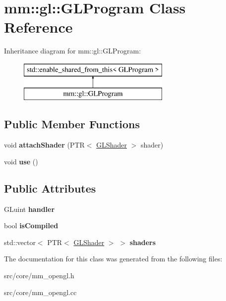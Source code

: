 \hypertarget{classmm_1_1gl_1_1_g_l_program}{}\section{mm\+:\+:gl\+:\+:G\+L\+Program Class Reference}
\label{classmm_1_1gl_1_1_g_l_program}
Inheritance diagram for mm\+:\+:gl\+:\+:G\+L\+Program\+:\begin{figure}[H]
\begin{center}
\leavevmode
\includegraphics[height=2.000000cm]{classmm_1_1gl_1_1_g_l_program}
\end{center}
\end{figure}
\subsection*{Public Member Functions}
\begin{DoxyCompactItemize}
\item 
\hypertarget{classmm_1_1gl_1_1_g_l_program_ae8619a76f9e2004447a0cee8b5349994}{}void {\bfseries attach\+Shader} (P\+T\+R$<$ \hyperlink{classmm_1_1gl_1_1_g_l_shader}{G\+L\+Shader} $>$ shader)\label{classmm_1_1gl_1_1_g_l_program_ae8619a76f9e2004447a0cee8b5349994}

\item 
\hypertarget{classmm_1_1gl_1_1_g_l_program_a07aecd22ad9833f74c3f9a2493a0dff9}{}void {\bfseries use} ()\label{classmm_1_1gl_1_1_g_l_program_a07aecd22ad9833f74c3f9a2493a0dff9}

\end{DoxyCompactItemize}
\subsection*{Public Attributes}
\begin{DoxyCompactItemize}
\item 
\hypertarget{classmm_1_1gl_1_1_g_l_program_a85f9c487f1c83f67db4ba3a9a20c3e7e}{}G\+Luint {\bfseries handler}\label{classmm_1_1gl_1_1_g_l_program_a85f9c487f1c83f67db4ba3a9a20c3e7e}

\item 
\hypertarget{classmm_1_1gl_1_1_g_l_program_a2df2c466433f3536642dd910a54cbb32}{}bool {\bfseries is\+Compiled}\label{classmm_1_1gl_1_1_g_l_program_a2df2c466433f3536642dd910a54cbb32}

\item 
\hypertarget{classmm_1_1gl_1_1_g_l_program_aee49d710f8d8159942c6074776d16c1e}{}std\+::vector$<$ P\+T\+R$<$ \hyperlink{classmm_1_1gl_1_1_g_l_shader}{G\+L\+Shader} $>$ $>$ {\bfseries shaders}\label{classmm_1_1gl_1_1_g_l_program_aee49d710f8d8159942c6074776d16c1e}

\end{DoxyCompactItemize}


The documentation for this class was generated from the following files\+:\begin{DoxyCompactItemize}
\item 
src/core/mm\+\_\+opengl.\+h\item 
src/core/mm\+\_\+opengl.\+cc\end{DoxyCompactItemize}
